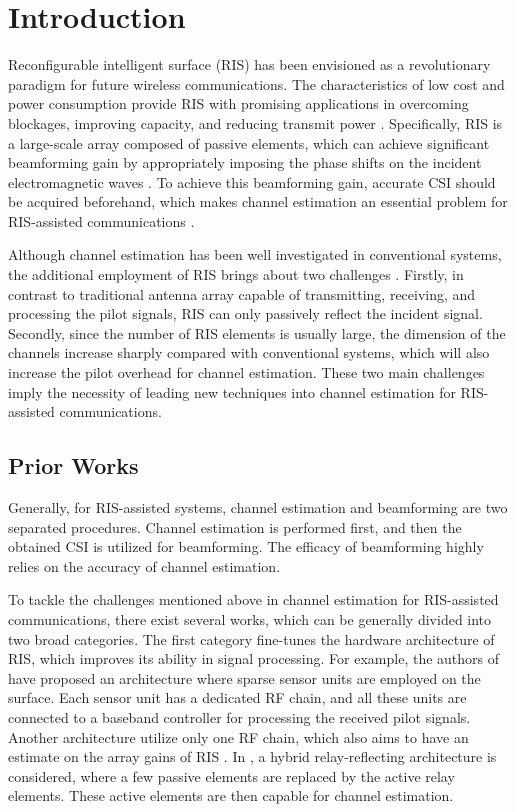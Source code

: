\documentclass[12pt,draftclsnofoot,journal,onecolumn]{IEEEtran}
\theoremstyle{nonumberplain}
\begin{document}
\section{Introduction}
Reconfigurable intelligent surface (RIS) has been envisioned as a revolutionary paradigm for future wireless communications.
The characteristics of low cost and power consumption provide RIS with promising applications in overcoming blockages, improving capacity, and reducing transmit power \cite{basar2019wireless,huang2020improvingcapacity,wu2019intelligent}.
Specifically, RIS is a large-scale array composed of passive elements, which can achieve significant beamforming gain by appropriately imposing the phase shifts on the incident electromagnetic waves \cite{di2020smart}.
To achieve this beamforming gain, accurate \ac{CSI} should be acquired beforehand, which makes channel estimation an essential problem for RIS-assisted communications \cite{wei2021channel}.

Although channel estimation has been well investigated in conventional systems, the additional employment of RIS brings about two challenges \cite{weili2021channel}.
Firstly, in contrast to traditional antenna array capable of transmitting, receiving, and processing the pilot signals, RIS can only passively reflect the incident signal.
Secondly, since the number of RIS elements is usually large, the dimension of the channels increase sharply compared with conventional systems, which will also increase the pilot overhead for channel estimation.
These two main challenges imply the necessity of leading new techniques into channel estimation for RIS-assisted communications.

\subsection{Prior Works}
\label{Prior Works}

Generally, for RIS-assisted systems, channel estimation and beamforming are two separated procedures.
Channel estimation is performed first, and then the obtained \ac{CSI} is utilized for beamforming.
The efficacy of beamforming highly relies on the accuracy of channel estimation.

To tackle the challenges mentioned above in channel estimation for RIS-assisted communications, there exist several works, which can be generally divided into two broad categories.
The first category fine-tunes the hardware architecture of RIS, which improves its ability in signal processing.
For example, the authors of \cite{taha2021enabling} have proposed an architecture where sparse sensor units are employed on the surface.
Each sensor unit has a dedicated \ac{RF} chain, and all these units are connected to a baseband controller for processing the received pilot signals.
Another architecture utilize only one \ac{RF} chain, which also aims to have an estimate on the array gains of RIS \cite{alexandropoulos2020hardware}.
In \cite{nguyen2021hybrid}, a hybrid relay-reflecting architecture is considered, where a few passive elements are replaced by the active relay elements.
These active elements are then capable for channel estimation.
\end{document}
